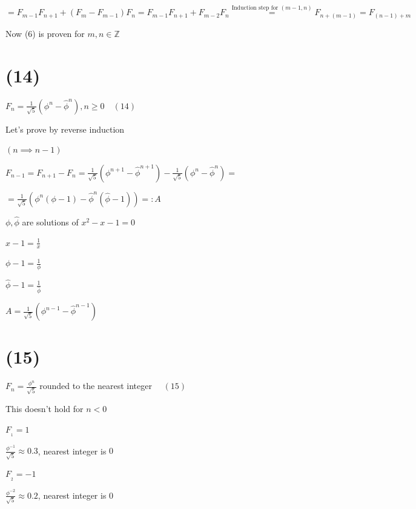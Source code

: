 \documentclass{article}
\begin{document}
\( = F_{m-1}F_{n+1} + (F_{m}-F_{m-1})F_{n} = F_{m-1}F_{n+1} + F_{m-2}F_{n} \overset{\textrm{Induction step for } (m-1, n)}{=} F_{n+(m-1)} = F_{(n-1) + m} \)

Now (6) is proven for \( m,n \in \mathbb{Z} \)

\section*{(14)}

\( F_{n} = \frac{1}{\sqrt{5}}(\phi^{n} - \widehat{\phi}^{n}), n \geq 0 \quad (14) \)

Let's prove by reverse induction

\( (n \implies n - 1) \)

\( F_{n-1} = F_{n+1} - F_{n} = \frac{1}{\sqrt{5}}(\phi^{n+1} - \widehat{\phi}^{n+1}) - \frac{1}{\sqrt{5}}(\phi^{n} - \widehat{\phi}^{n}) = \)

\( = \frac{1}{\sqrt{5}}(\phi^{n}(\phi -1) - \widehat{\phi}^{n}(\widehat{\phi} - 1)) =: A \)

\( \phi, \widehat{\phi} \) are solutions of \( x^{2}-x-1 = 0 \)

\( x - 1 = \frac{1}{x} \)

\( \phi - 1 = \frac{1}{\phi} \)

\( \widehat{\phi} - 1 = \frac{1}{\widehat{\phi}} \)

\( A = \frac{1}{\sqrt{5}}(\phi^{n-1} - \widehat{\phi}^{n-1}) \)

\section*{(15)}

\( F_{n} = \frac{\phi^{n}}{\sqrt{5}} \) rounded to the nearest integer \( \quad (15) \)

This doesn't hold for \( n < 0 \)

\( F_{_{1}} = 1 \)

\( \frac{\phi^{-1}}{\sqrt{5}} \approx 0.3 \), nearest integer is \( 0 \)

\( F_{_{2}} = -1 \)

\( \frac{\phi^{-2}}{\sqrt{5}} \approx 0.2 \), nearest integer is \( 0 \)
\end{document}
